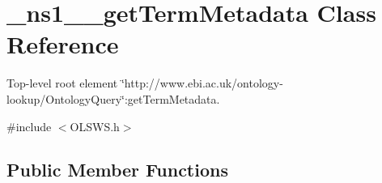 \hypertarget{class__ns1____getTermMetadata}{
\section{\_\-ns1\_\-\_\-getTermMetadata Class Reference}
\label{class__ns1____getTermMetadata}
}


Top-\/level root element \char`\"{}http://www.ebi.ac.uk/ontology-\/lookup/OntologyQuery\char`\"{}:getTermMetadata.  




{\ttfamily \#include $<$OLSWS.h$>$}

\subsection*{Public Member Functions}
